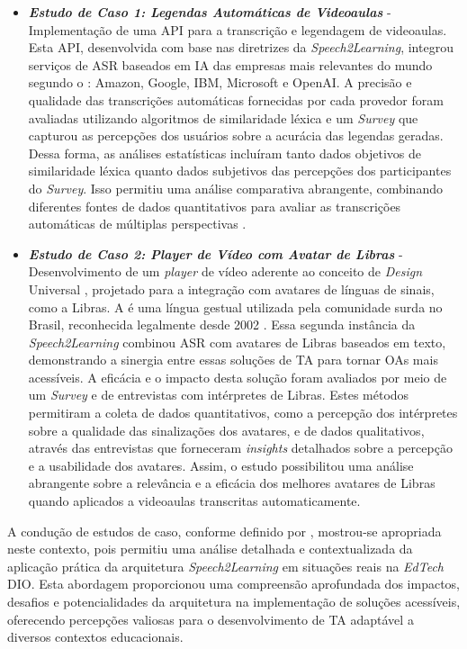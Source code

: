 \begin{itemize}
\item \textbf{\textit{Estudo de Caso 1: Legendas Automáticas de Videoaulas}} - Implementação de uma API para a transcrição e legendagem de videoaulas. Esta API, desenvolvida com base nas diretrizes da \textit{Speech2Learning}, integrou serviços de ASR baseados em IA das empresas mais relevantes do mundo segundo o : Amazon, Google, IBM, Microsoft e OpenAI. A precisão e qualidade das transcrições automáticas fornecidas por cada provedor foram avaliadas utilizando algoritmos de similaridade léxica e um \textit{Survey} que capturou as percepções dos usuários sobre a acurácia das legendas geradas. Dessa forma, as análises estatísticas incluíram tanto dados objetivos de similaridade léxica quanto dados subjetivos das percepções dos participantes do \textit{Survey}. Isso permitiu uma análise comparativa abrangente, combinando diferentes fontes de dados quantitativos para avaliar as transcrições automáticas de múltiplas perspectivas \cite{FalvoJr2023_HICSS, FalvoJr2024_FIE}.

\item \textbf{\textit{Estudo de Caso 2: Player de Vídeo com Avatar de Libras}} - Desenvolvimento de um \textit{player} de vídeo aderente ao conceito de \textit{Design} Universal \cite{GovBr2023}, projetado para a integração com avatares de línguas de sinais, como a Libras. A  é uma língua gestual utilizada pela comunidade surda no Brasil, reconhecida legalmente desde 2002 \cite{Quadros2017, Quadros2019, Honora2021}. Essa segunda instância da \textit{Speech2Learning} combinou ASR com avatares de Libras baseados em texto, demonstrando a sinergia entre essas soluções de TA para tornar OAs mais acessíveis. A eficácia e o impacto desta solução foram avaliados por meio de um \textit{Survey} e de entrevistas com intérpretes de Libras. Estes métodos permitiram a coleta de dados quantitativos, como a percepção dos intérpretes sobre a qualidade das sinalizações dos avatares, e de dados qualitativos, através das entrevistas que forneceram \textit{insights} detalhados sobre a percepção e a usabilidade dos avatares. Assim, o estudo possibilitou uma análise abrangente sobre a relevância e a eficácia dos melhores avatares de Libras quando aplicados a videoaulas transcritas automaticamente.
\end{itemize}

A condução de estudos de caso, conforme definido por , mostrou-se apropriada neste contexto, pois permitiu uma análise detalhada e contextualizada da aplicação prática da arquitetura \textit{Speech2Learning} em situações reais na \textit{EdTech} DIO. Esta abordagem proporcionou uma compreensão aprofundada dos impactos, desafios e potencialidades da arquitetura na implementação de soluções acessíveis, oferecendo percepções valiosas para o desenvolvimento de TA adaptável a diversos contextos educacionais.


